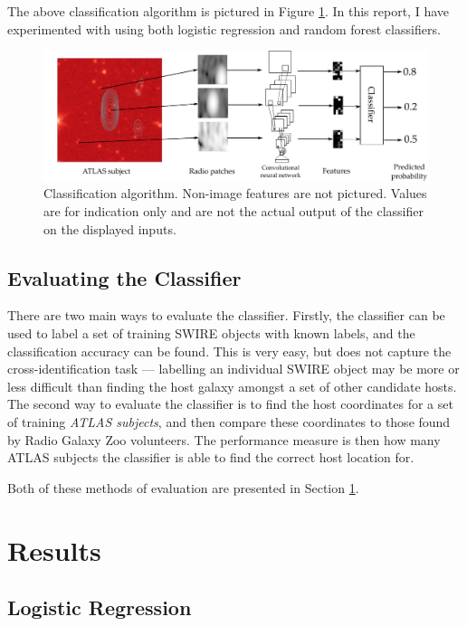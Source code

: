 \documentclass[a4paper]{article}
\newcommand{\fig}{Figure }
\newcommand{\sect}{Section }
\begin{document}
      The above classification algorithm is pictured in \fig \ref{fig:pipeline}. In this report, I have experimented with using both logistic regression and random forest classifiers.

      \begin{figure}[!ht]
        \centering
        \includegraphics[width=0.9\linewidth]{images/pipeline.pdf}
        \caption{Classification algorithm. Non-image features are not pictured. Values are for indication only and are not the actual output of the classifier on the displayed inputs.}
        \label{fig:pipeline}
      \end{figure}

    \subsection{Evaluating the Classifier}

      There are two main ways to evaluate the classifier. Firstly, the classifier can be used to label a set of training SWIRE objects with known labels, and the classification accuracy can be found. This is very easy, but does not capture the cross-identification task --- labelling an individual SWIRE object may be more or less difficult than finding the host galaxy amongst a set of other candidate hosts. The second way to evaluate the classifier is to find the host coordinates for a set of training \emph{ATLAS subjects}, and then compare these coordinates to those found by Radio Galaxy Zoo volunteers. The performance measure is then how many ATLAS subjects the classifier is able to find the correct host location for.

      Both of these methods of evaluation are presented in \sect \ref{sec:results}.

  \section{Results}
    \label{sec:results}

    \subsection{Logistic Regression}
\end{document}
